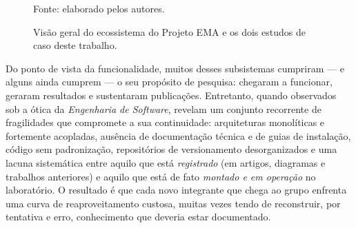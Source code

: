 \begin{figure}[H]
	\centering
	\caption{Visão geral do ecossistema do Projeto EMA e os dois estudos de caso deste trabalho.}
	\label{fig:ecossistema}
	\vspace{6pt}

	\vspace{4pt}
	{\footnotesize Fonte: elaborado pelos autores.}
\end{figure}

Do ponto de vista da funcionalidade, muitos desses subsistemas cumpriram --- e alguns
ainda cumprem --- o seu propósito de pesquisa: chegaram a funcionar, geraram resultados e
sustentaram publicações. Entretanto, quando observados sob a ótica da
\emph{Engenharia de Software}, revelam um conjunto recorrente de fragilidades que
compromete a sua continuidade: arquiteturas monolíticas e fortemente acopladas, ausência
de documentação técnica e de guias de instalação, código sem padronização, repositórios de
versionamento desorganizados e uma lacuna sistemática entre aquilo que está
\emph{registrado} (em artigos, diagramas e trabalhos anteriores) e aquilo que está de fato
\emph{montado e em operação} no laboratório. O resultado é que cada novo integrante que
chega ao grupo enfrenta uma curva de reaproveitamento custosa, muitas vezes tendo de
reconstruir, por tentativa e erro, conhecimento que deveria estar documentado.

